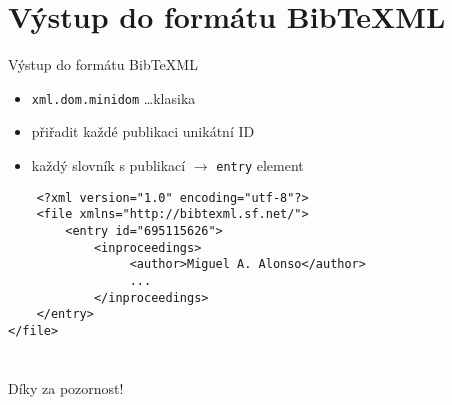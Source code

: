 \documentclass{beamer}
\begin{document}
\section{Výstup do formátu BibTeXML}

\begin{frame}[fragile]{Výstup do formátu BibTeXML}
\begin{itemize}
	\item \verb!xml.dom.minidom! \dots klasika
	\item přiřadit každé publikaci unikátní ID
	\item každý slovník s publikací $\rightarrow$ \verb!entry! element
\end{itemize}

\begin{verbatim}
	<?xml version="1.0" encoding="utf-8"?>
	<file xmlns="http://bibtexml.sf.net/">
	    <entry id="695115626">
            <inproceedings>
                 <author>Miguel A. Alonso</author>
                 ...
            </inproceedings>
    </entry>
</file>
\end{verbatim}
\end{frame}

\section{}

\begin{frame}{}
	\begin{center}
		Díky za pozornost!
	\end{center}

\end{frame}
\end{document}
